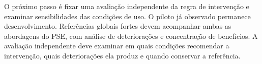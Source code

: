 O próximo passo é fixar uma avaliação independente da regra de intervenção e examinar sensibilidades das condições de uso. O piloto já observado permanece desenvolvimento. Referências globais fortes devem acompanhar ambas as abordagens do PSE, com análise de deteriorações e concentração de benefícios. A avaliação independente deve examinar em quais condições recomendar a intervenção, quais deteriorações ela produz e quando conservar a referência.
